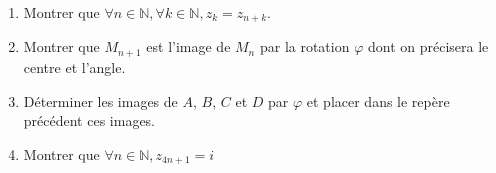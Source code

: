 \documentclass[12pts]{book}
\begin{document}
\begin{enumerate}
\begin{enumerate}
					\begin{enumerate}
						\item Montrer que $\forall n \in \mathbb{N}, \forall k \in \mathbb{N}, z_k=z_{n+k}$.
						\item Montrer que $M_{n+1}$ est l'image de $M_n$ par la rotation $\varphi$ dont on précisera le centre et l'angle.
						\item Déterminer les images de $A$, $B$, $C$ et $D$ par $\varphi$ et placer dans le repère précédent ces images.
						\item Montrer que $\forall n\in \mathbb{N}, z_{4n+1}=i$
					\end{enumerate}
			\end{enumerate}
	\end{enumerate}
\end{document}
